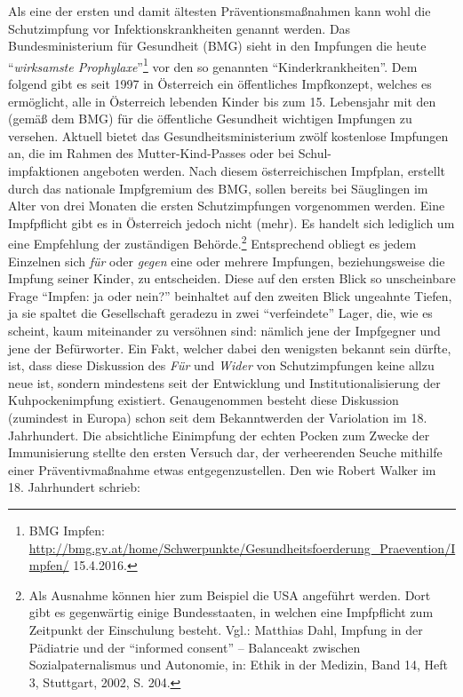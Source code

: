 \documentclass[
    a4paper,
    12pt,
    hyphens,
    chapterprefix=true,
    headheight=33pt,
    footheight=29pt,
    headings=optiontohead,
]{scrartcl}
\begin{document}
Als eine der ersten und damit ältesten Präventionsmaßnahmen kann wohl die Schutzimpfung vor Infektionskrankheiten genannt werden. Das Bundesministerium für Gesundheit (BMG) sieht in den Impfungen die heute "`\textit{wirksamste Prophylaxe}"'\footnote{BMG Impfen: \url{http://bmg.gv.at/home/Schwerpunkte/Gesundheitsfoerderung\_Praevention/Impfen/} 15.4.2016.} vor den so genannten "`Kinderkrankheiten"'. Dem folgend gibt es seit 1997 in Österreich ein öffentliches Impfkonzept, welches es ermöglicht, alle in Österreich lebenden Kinder bis zum 15. Lebensjahr mit den (gemäß dem BMG) für die öffentliche Gesundheit wichtigen Impfungen zu versehen. Aktuell bietet das Gesundheitsministerium zwölf kostenlose Impfungen an, die im Rahmen des Mutter-Kind-Passes oder bei
Schul-\\impfaktionen angeboten werden. Nach diesem österreichischen Impfplan, erstellt durch das nationale Impfgremium des BMG, sollen bereits bei Säuglingen im Alter von drei Monaten die ersten Schutzimpfungen vorgenommen werden. Eine Impfpflicht gibt es in Österreich jedoch nicht (mehr). Es handelt sich lediglich um eine Empfehlung der zuständigen Behörde.\footnote{Als Ausnahme können hier zum Beispiel die USA angeführt werden. Dort gibt es gegenwärtig einige Bundesstaaten, in welchen eine Impfpflicht zum Zeitpunkt der Einschulung besteht. Vgl.: Matthias Dahl, Impfung in der Pädiatrie und der "`informed consent"' -- Balanceakt zwischen Sozialpaternalismus und Autonomie, in: Ethik in der Medizin, Band 14, Heft 3, Stuttgart, 2002, S. 204.} Entsprechend obliegt es jedem Einzelnen sich \textit{für} oder \textit{gegen} eine oder mehrere Impfungen, beziehungsweise die Impfung seiner Kinder, zu entscheiden. Diese auf den ersten Blick so unscheinbare Frage "`Impfen: ja oder nein?"' beinhaltet auf den zweiten Blick ungeahnte Tiefen, ja sie spaltet die Gesellschaft geradezu in zwei "`verfeindete"' Lager, die, wie es scheint, kaum miteinander zu versöhnen sind: nämlich jene der Impfgegner und jene der Befürworter. Ein Fakt, welcher dabei den wenigsten bekannt sein dürfte, ist, dass diese Diskussion des \textit{Für} und \textit{Wider} von Schutzimpfungen keine allzu neue ist, sondern mindestens seit der Entwicklung und Institutionalisierung der Kuhpockenimpfung existiert. Genaugenommen besteht diese Diskussion (zumindest in Europa) schon seit dem Bekanntwerden der Variolation im 18. Jahrhundert. Die absichtliche Einimpfung der echten Pocken zum Zwecke der Immunisierung stellte den ersten Versuch dar, der verheerenden Seuche mithilfe einer Präventivmaßnahme etwas entgegenzustellen. Den wie Robert Walker im 18. Jahrhundert schrieb: \\
\end{document}
